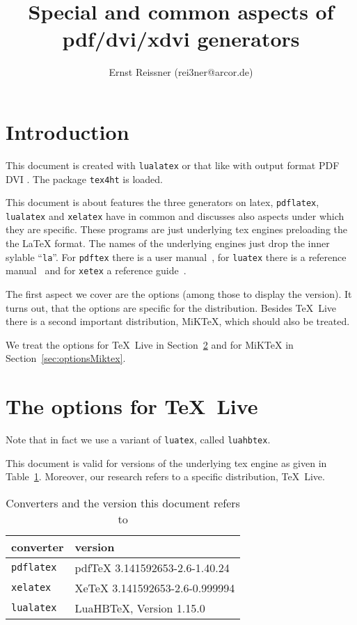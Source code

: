 \documentclass{article}
\title{Special and common aspects of pdf/dvi/xdvi generators }
\author{Ernst Reissner (rei3ner@arcor.de)}
\date{}
\newcommand{\pdflatex}{\texttt{pdflatex}}
\newcommand{\lualatex}{\texttt{lualatex}}
\newcommand{\xelatex}{\texttt{xelatex}}
\newcommand{\texlive}{\TeX~Live}
\newcommand{\miktex}{MiKTeX}
\begin{document}
\maketitle
\tableofcontents
\listoftables

\section{Introduction}

This document is created with \lualatex{} or that like 
with output format 
\ifpdf%
PDF%
\else
DVI%
\fi.
The package \texttt{tex4ht} 
is  loaded. 

This document is about features the three generators on latex, 
\pdflatex, \lualatex{} and \xelatex{} have in common 
and discusses also aspects under which they are specific. 
These programs are just underlying tex engines preloading the the \LaTeX{} format. 
The names of the underlying engines just drop the inner sylable "`\texttt{la}"'. 
For \texttt{pdftex} there is a user manual~\cite{PdfTexUsr}, 
for \texttt{luatex} there is a reference manual~\cite{LuaTexRef} and 
for \texttt{xetex} a reference guide~\cite{XeTexRef}. 

The first aspect we cover are the options (among those to display the version). 
It turns out, that the options are specific for the distribution. 
Besides \texlive{} there is a second important distribution, \miktex, 
which should also be treated. 





We treat the options for \texlive{} in Section~\ref{sec:optionsTexlive} 
and for \miktex{} in Section~\ref{sec:optionsMiktex}. 

\section{The options for \texlive}\label{sec:optionsTexlive}


Note that in fact we use a variant of \texttt{luatex}, called \texttt{luahbtex}. 

This document is valid for versions of the underlying tex engine 
as given in Table~\ref{tab:versions}. 
Moreover, our research refers to a specific distribution, \texlive. 


\begin{longtable}{|ll|}
  \toprule
  converter & version \\
  \midrule
  \midrule
  \endfirsthead%
  \bottomrule
  \caption{\label{tab:versions} Converters and the version this document refers to }
  \endlastfoot%
  \pdflatex{}  & pdfTeX 3.141592653-2.6-1.40.24 \\
  \xelatex{}   & XeTeX 3.141592653-2.6-0.999994 \\
  \lualatex{}  & LuaHBTeX, Version 1.15.0 \\
\end{longtable}
\end{document}

